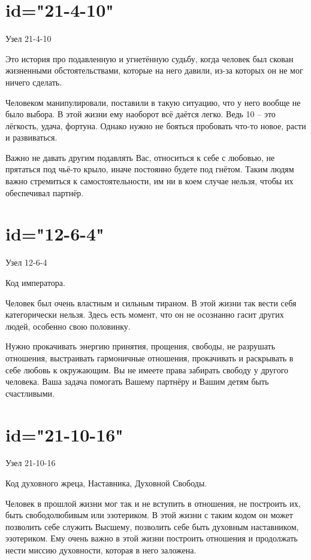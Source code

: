 \section{id="21-4-10"}{Узел 21-4-10}
\item Это история про подавленную и угнетённую судьбу, когда 
человек был скован жизненными обстоятельствами, которые на него 
давили, из-за которых он не мог ничего сделать.
\item Человеком манипулировали, поставили в такую ситуацию, 
что у него вообще не было выбора. В этой жизни ему наоборот 
всё даётся легко. Ведь 10 – это лёгкость, удача, фортуна. 
Однако нужно не бояться пробовать что-то новое, расти и 
развиваться.
\item Важно не давать другим подавлять Вас, относиться к себе 
с любовью, не прятаться под чьё-то крыло, иначе постоянно 
будете под гнётом. Таким людям важно стремиться к 
самостоятельности, им ни в коем случае нельзя, чтобы их 
обеспечивал партнёр.
\endsection

\section{id="12-6-4"}{Узел 12-6-4}
\item Код императора.
\item Человек был очень властным и сильным тираном. В этой 
жизни так вести себя категорически нельзя. Здесь есть момент, 
что он не осознанно гасит других людей, особенно свою половинку.
\item Нужно прокачивать энергию принятия, прощения, свободы, 
не разрушать отношения, выстраивать гармоничные отношения, 
прокачивать и раскрывать в себе любовь к окружающим. Вы не 
имеете права забирать свободу у другого человека. Ваша задача 
помогать Вашему партнёру и Вашим детям быть счастливыми.
\endsection

\section{id="21-10-16"}{Узел 21-10-16}
\item Код духовного жреца, Наставника, Духовной Свободы.
\item Человек в прошлой жизни мог так и не вступить в отношения, 
не построить их, быть свободолюбивым или эзотериком. В этой 
жизни с таким кодом он может позволить себе служить Высшему, 
позволить себе быть духовным наставником, эзотериком. Ему очень 
важно в этой жизни построить отношения и продолжать нести 
миссию духовности, которая в него заложена.
\endsection

